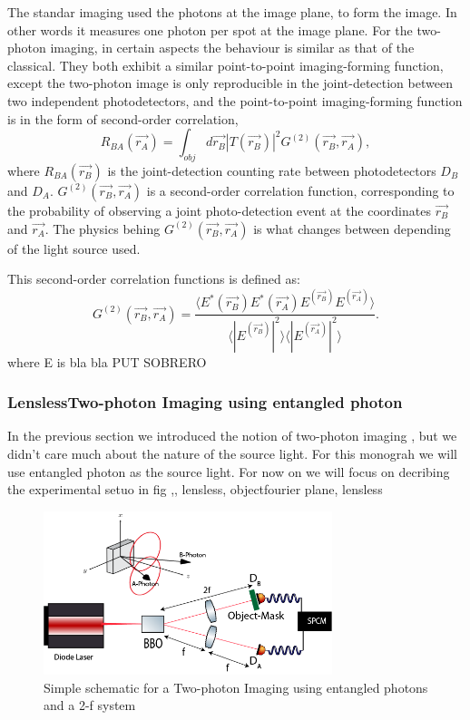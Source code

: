The standar imaging used the photons at the image plane, to form the image. In other 
words it measures one photon per spot at the image plane. For the two-photon imaging, in certain 
aspects the behaviour is similar as that of the classical.
They both exhibit a similar point-to-point imaging-forming function, except the 
two-photon image is only reproducible in the joint-detection between two independent photodetectors,
and the point-to-point imaging-forming function is in the form of second-order correlation,
\begin{equation}\label{eq:coincidences}
R_{BA}(\vec{r_A})=\int_{obj} d\vec{r_B} |T(\vec{r_B})|^2 G^{(2)}(\vec{r_B},\vec{r_A}),
\end{equation}
where $R_{BA}(\vec{r_B})$ is the joint-detection counting rate between photodetectors $D_B$ and $D_A$.
$G^{(2)}(\vec{r_B},\vec{r_A})$ is a second-order correlation
function, corresponding to the probability of observing a joint photo-detection event
at the coordinates $\vec{r_B}$ and $\vec{r_A}$. The physics behing $G^{(2)}(\vec{r_B},\vec{r_A})$
is what changes between depending of the light source used.

This second-order correlation functions is defined as\cite{introquantumoptics}:
\begin{equation}
G^{(2)} (\vec{r_B},\vec{r_A})= \frac{ \langle E^* (\vec{r_B}) E^* (\vec{r_A}) E^ (\vec{r_B}) E^ (\vec{r_A}) \rangle }{\langle |E^ (\vec{r_B})|^2 \rangle \langle |E^ (\vec{r_A})|^2 \rangle}.
\end{equation}
where E is bla bla PUT SOBRERO
\subsubsection{LenslessTwo-photon Imaging using entangled photon}

In the previous section we introduced the notion of two-photon imaging , but we didn't care 
much about the nature of the source light. For this monograh we will use entangled photon as the 
source light. For now on we will focus on decribing the 
experimental setuo in fig ,, lensless, objectfourier plane, lensless 


\begin{figure}[h]
\centering
\includegraphics[width=0.75\textwidth]{Figures/simpleTwo.png}
\caption{Simple schematic for a Two-photon Imaging using entangled photons and a 2-f system} 
\label{fig:2f}
\end{figure}


